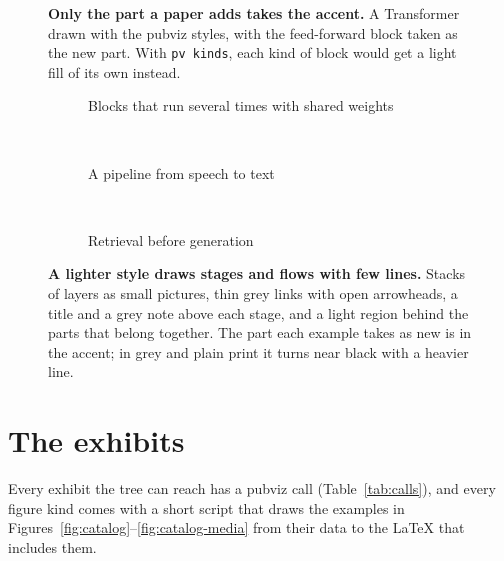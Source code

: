 \documentclass[11pt]{article}
\newcommand\code[1]{\texttt{#1}}
\begin{document}
\begin{figure}[tb]
  \centering
  \transformer[pv kinds=false, ffn/.append style={pv new}]
  \caption{\textbf{Only the part a paper adds takes the accent.} A
    Transformer drawn with the pubviz styles, with the feed-forward block
    taken as the new part. With \code{pv kinds}, each kind of block would get
    a light fill of its own instead.}
  \label{fig:transformer}
\end{figure}

\begin{figure}[tbp]
  \centering
  \begin{subfigure}{\linewidth}\centering
    \looped\caption{Blocks that run several times with shared weights}
  \end{subfigure}\\[8pt]
  \begin{subfigure}{\linewidth}\centering
    \asr\caption{A pipeline from speech to text}
  \end{subfigure}\\[8pt]
  \begin{subfigure}{\linewidth}\centering
    \retrieval\caption{Retrieval before generation}
  \end{subfigure}
  \caption{\textbf{A lighter style draws stages and flows with few lines.}
    Stacks of layers as small pictures, thin grey links with open arrowheads,
    a title and a grey note above each stage, and a light region behind the
    parts that belong together. The part each example takes as new is in
    the accent; in grey and plain print it turns near black with a heavier
    line.}
  \label{fig:light-diagrams}
\end{figure}

\section{The exhibits}\label{sec:catalog}

Every exhibit the tree can reach has a pubviz call (Table~\ref{tab:calls}),
and every figure kind comes with a short script that draws the examples in
Figures~\ref{fig:catalog}--\ref{fig:catalog-media} from their data to the
LaTeX that includes them.
\end{document}
